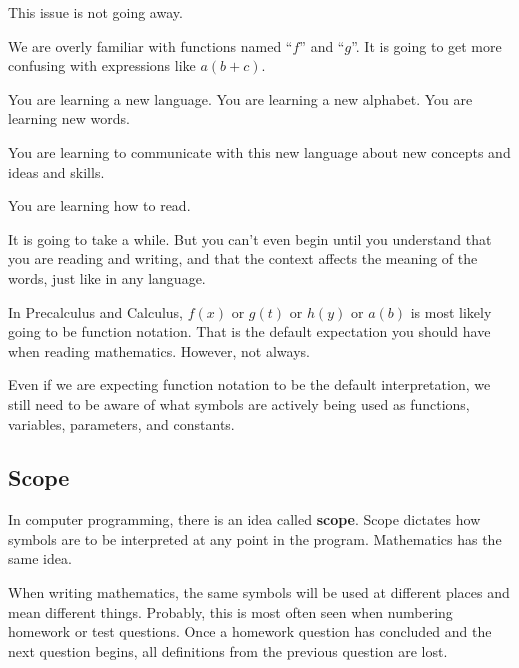 \documentclass{ximera}
\begin{document}
This issue is not going away. 


We are overly familiar with functions named ``$f$'' and ``$g$''.  It is going to get more confusing with expressions like $a(b+c)$.




You are learning a new language.  You are learning a new alphabet.  You are learning new words. 

You are learning to communicate with this new language about new concepts and ideas and skills.  


You are learning how to read. 


It is going to take a while.  But you can't even begin until you understand that you are reading and writing, and that the context affects the meaning of the words, just like in any language.



In Precalculus and Calculus, $f(x)$ or $g(t)$ or $h(y)$ or $a(b)$ is most likely going to be function notation.  That is the default expectation you should have when reading mathematics. However, not always.


Even if we are expecting function notation to be the default interpretation, we still need to be aware of what symbols are actively being used as functions, variables, parameters, and constants.


\subsection*{Scope}

In computer programming, there is an idea called \textbf{scope}. Scope dictates how symbols are to be interpreted at any point in the program. Mathematics has the same idea.

When writing mathematics, the same symbols will be used at different places and mean different things.  Probably, this is most often seen when numbering homework or test questions.  Once a homework question has concluded and the next question begins, all definitions from the previous question are lost. 
\end{document}

